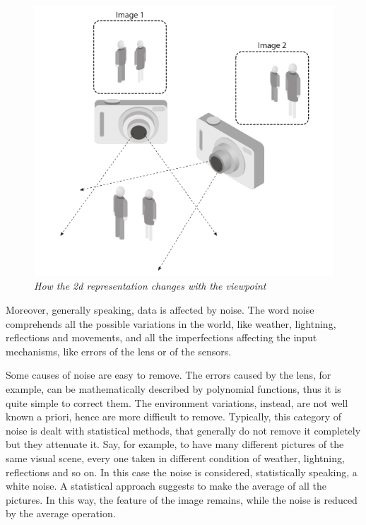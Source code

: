 	\begin{figure}[h]
	  \begin{center} 
	    \includegraphics[scale=0.6]{images/ch_01/2d_3d.png}
	  \end{center} 
	  \caption{\textit{How the 2d representation changes with the viewpoint}}  
	  \label{fig:2d3d}
	\end{figure}

	Moreover, generally speaking, data is affected by noise. The word noise comprehends all the possible variations in the world, like weather, lightning, reflections and movements, and all the imperfections affecting the input mechanisms, like errors of the lens or of the sensors. 
	
	Some causes of noise are easy to remove. The errors caused by the lens, for example, can be mathematically described by polynomial functions, thus it is quite simple to correct them. 
	The environment variations, instead, are not well known a priori, hence are more difficult to remove. Typically, this category of noise is dealt with statistical methods, that generally do not remove it completely but they attenuate it. Say, for example, to have many different pictures of the same visual scene, every one taken in different condition of weather, lightning, reflections and so on. In this case the noise is considered, statistically speaking, a white noise. A statistical approach suggests to make the average of all the pictures. In this way, the feature of the image remains, while the noise is reduced by the average operation.
	
